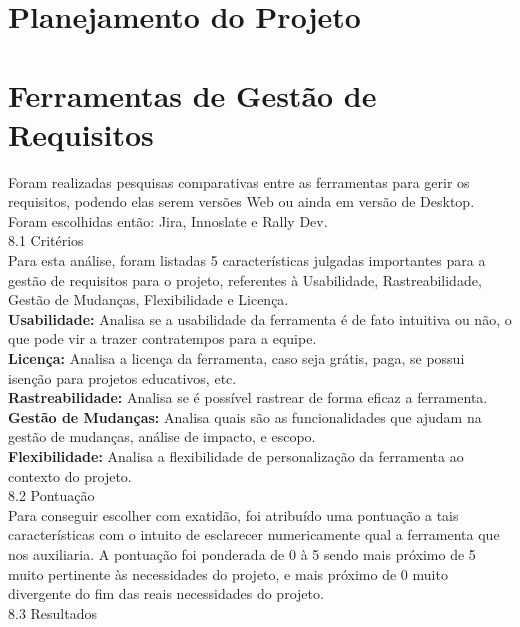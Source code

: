 {{\section{Planejamento do Projeto}
\label{sec:nova_sess_o}

\section{Ferramentas de Gestão de Requisitos}
\label{sec}
\tab Foram realizadas pesquisas comparativas entre as ferramentas para gerir os requisitos, podendo elas serem versões Web ou ainda em versão de Desktop. Foram escolhidas então: Jira, Innoslate e Rally Dev.\\

{\large{8.1 Critérios}}\\

\tab Para esta análise, foram listadas 5 características julgadas importantes para a gestão de requisitos para o projeto, referentes à Usabilidade, Rastreabilidade, Gestão de Mudanças, Flexibilidade e Licença.\\
\tab \textbf{Usabilidade:} Analisa se a usabilidade da ferramenta é de fato intuitiva ou não, o que pode vir a trazer contratempos para a equipe.\\
\tab \textbf{Licença:} Analisa a licença da ferramenta, caso seja grátis, paga, se possui isenção para projetos educativos, etc.\\
\tab \textbf{Rastreabilidade:} Analisa se é possível rastrear de forma eficaz a ferramenta.\\
\tab \textbf{Gestão de Mudanças:} Analisa quais são as funcionalidades que ajudam na gestão de mudanças, análise de impacto, e escopo.\\
\tab \textbf{Flexibilidade:} Analisa a flexibilidade de personalização da ferramenta ao contexto do projeto.\\

{\large{8.2 Pontuação}}\\

\tab Para conseguir escolher com exatidão, foi atribuído uma pontuação a tais características com o intuito de esclarecer numericamente qual a ferramenta que nos auxiliaria. A pontuação foi ponderada de 0 à 5 sendo mais próximo de 5 muito pertinente às necessidades do projeto, e mais próximo de 0 muito divergente do fim das reais necessidades do projeto.\\

{\large{8.3 Resultados}}\\

}}
